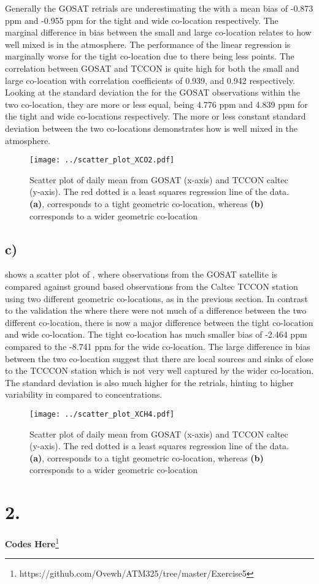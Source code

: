 Generally the GOSAT retrials
are underestimating the  with a mean bias of -0.873 ppm and -0.955 ppm for the
tight and wide co-location respectively. The marginal difference in bias between
the small and large co-location relates to how well mixed  is in the
atmosphere. The performance of the linear
regression is marginally worse for the tight co-location due to there being less
points. The correlation between GOSAT and TCCON is quite high for both the small
and large co-location with correlation coefficients of 0.939, and 0.942
respectively. Looking at the
standard deviation the for the GOSAT observations within the two  co-location, they
are more or less equal, being 4.776 ppm and 4.839 ppm for the tight and wide
co-locations respectively. The more or less constant standard deviation between
the two co-locations demonstrates how  is well mixed in the atmosphere.
\begin{figure}[htbp]
    \centering
    \texttt{[image: ../scatter\_plot\_XCO2.pdf]}
    \caption{Scatter plot of daily mean  from GOSAT (x-axis) and TCCON caltec (y-axis). The red dotted is a least squares regression line of the data. \textbf{(a)}, corresponds to a tight geometric co-location, whereas \textbf{(b)} corresponds to a wider geometric co-location}
    \label{fig:scatter_XCO2}
\end{figure}

\subsection*{c)} 
 shows a scatter plot of , where observations
from the GOSAT satellite is compared against ground based observations from
the Caltec TCCON station using two different geometric co-locations, as in the
previous section. In contrast to the  validation the where there were
not much of a difference between the two different co-location, there is now a
major difference between the tight co-location and wide co-location. The tight
co-location has much smaller bias of -2.464 ppm compared to the -8.741 ppm for
the wide co-location. The large difference in bias between the two co-location
suggest that there are local sources and sinks of  close to the TCCCON
station which is not very well captured by the wider co-location. The standard deviation is also much higher for the
 retrials, hinting to higher variability in  compared to  
concentrations. 
\begin{figure}
    \centering
    \texttt{[image: ../scatter\_plot\_XCH4.pdf]}
    \caption{Scatter plot of daily mean  from GOSAT (x-axis) and TCCON caltec (y-axis). The red dotted is a least squares regression line of the data. \textbf{(a)}, corresponds to a tight geometric co-location, whereas \textbf{(b)} corresponds to a wider geometric co-location}
    \label{fig:scatter_XCH4}
\end{figure}

\section*{2.}


\textbf{Codes Here}\footnote{https://github.com/Ovewh/ATM325/tree/master/Exercise5}
